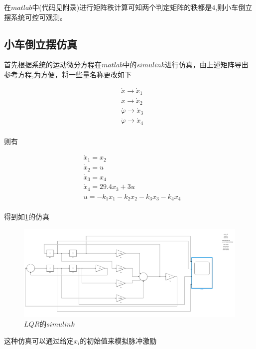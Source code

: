 \documentclass{MathorCupmodeling}
\begin{document}
在$matlab$中(代码见附录)进行矩阵秩计算可知两个判定矩阵的秩都是$4$,则小车倒立摆系统可控可观测。

\subsection{小车倒立摆仿真}

首先根据系统的运动微分方程在$matlab$中的$simulink$进行仿真，由上述矩阵导出参考方程,为方便，将一些量名称更改如下

\begin{equation}
\begin{aligned}
&\dot x\rightarrow \dot x_1\\
&\ddot x\rightarrow \dot x_2\\
&\dot \varphi \rightarrow \dot x_3\\
&\ddot \varphi \rightarrow \dot x_4\\
\end{aligned}
\end{equation}

则有

\begin{equation}
\begin{aligned}
&\dot x_1=x_2\\
&\dot x_2=u\\
&\dot x_3=x_4\\
&\dot x_4=29.4x_3+3u\\
&u=-k_1x_1-k_2x_2-k_3x_3-k_4x_4\\
\end{aligned}
\end{equation}

得到如\cref{LQR_simulink}的仿真

\begin{figure}[hbpt]
\centering
\includegraphics[width=16cm]{LQR_simulink.png}
\caption{$LQR的simulink$}\label{LQR_simulink}
\end{figure}

这种仿真可以通过给定$x_i$的初始值来模拟脉冲激励
\end{document}
